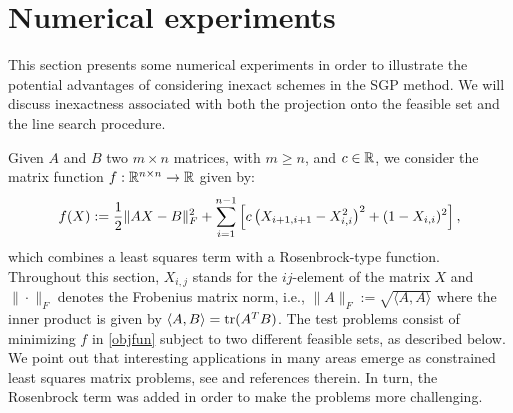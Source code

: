 \chapter{Numerical experiments} \label{chap:NumExp}
This section presents some numerical experiments in order to illustrate the potential advantages of considering inexact schemes in the SGP method.
We will discuss inexactness associated with both the projection onto the feasible set and the line search procedure. 

Given $A$ and $B$ two $m\times n$ matrices, with $m\geq n$, and $c\in\mathbb{R}$, we consider the matrix function $f:\mathbb{R}^{n\times n}\to\mathbb{R}$ given by:
\begin{equation}\label{objfun}
f(X):=\displaystyle\frac{1}{2}\|AX-B\|^2_F + \sum_{i=1}^{n-1} \left[ c \left( X_{i+1,i+1}-X_{i,i}^2 \right)^2 + (1-X_{i,i})^2   \right],
\end{equation}
which combines a least squares term with a Rosenbrock-type function. 
Throughout this section, $X_{i,j}$ stands for the $ij$-element of the matrix $X$ and $\|\cdot\|_F$ denotes the Frobenius matrix norm, i.e., $\|A\|_F:=\sqrt{\langle A,A \rangle}$ where the inner product is given by $\langle A,B \rangle = \textrm{tr}(A^TB)$.
The test problems consist of minimizing $f$ in \eqref{objfun} subject to two different feasible sets, as described below.
We point out that interesting applications in many areas emerge as constrained least squares matrix problems, see \cite{BirginMartinezRaydan2003} and references therein.
In turn, the Rosenbrock term was added in order to make the problems more challenging.

